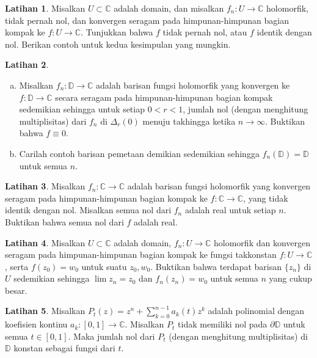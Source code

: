 \documentclass[12pt,openany]{book}
\newcommand{\C}{{\mathbb{C}}}
\newcommand{\D}{{\mathbb{D}}}
\theoremstyle{plain}
\theoremstyle{remark}
\theoremstyle{definition}
\newenvironment{exbox}{%
    \def\FrameCommand{\vrule width 1pt \relax\hspace{10pt}}%
    \MakeFramed{\advance\hsize-\width\FrameRestore}%
}{%
    \endMakeFramed
}
\newenvironment{exparts}{%
    \leavevmode\begin{enumerate}[a),noitemsep,topsep=0pt,parsep=0pt,partopsep=0pt]
}{%
    \end{enumerate}
}
\theoremstyle{exercise}
\newtheorem{exercise}{Latihan}[section]
\theoremstyle{example}
\begin{document}
\begin{exbox}
\begin{exercise}
Misalkan $U \subset \C$ adalah domain,
dan misalkan
$f_n \colon U \to \C$ holomorfik, tidak pernah nol,
dan konvergen seragam pada himpunan-himpunan bagian kompak ke $f \colon U \to \C$.
Tunjukkan bahwa $f$ tidak pernah nol, atau $f$ identik dengan nol.
Berikan contoh untuk kedua kesimpulan yang mungkin.
\end{exercise}

\begin{exercise}
\begin{exparts}
\item
Misalkan $f_n \colon \D \to \C$ adalah barisan fungsi holomorfik yang konvergen
ke $f \colon \D \to \C$ secara seragam pada himpunan-himpunan bagian kompak sedemikian sehingga
untuk setiap $0 < r < 1$, jumlah nol (dengan menghitung multiplisitas)
dari $f_n$ di $\Delta_r(0)$ menuju takhingga ketika $n \to \infty$.
Buktikan bahwa $f \equiv 0$.
\item
Carilah contoh barisan pemetaan demikian sedemikian sehingga $f_n(\D) = \D$
untuk semua $n$.
\end{exparts}
\end{exercise}

\begin{exercise}
Misalkan 
$f_n \colon \C \to \C$ adalah barisan fungsi holomorfik
yang
konvergen seragam pada himpunan-himpunan bagian kompak ke $f \colon \C \to \C$,
yang tidak identik dengan nol.
Misalkan semua nol dari $f_n$ adalah real untuk setiap $n$.
Buktikan bahwa semua nol dari $f$ adalah real.
\end{exercise}

\begin{exercise}
Misalkan $U \subset \C$ adalah domain,
$f_n \colon U \to \C$ holomorfik
dan konvergen seragam pada himpunan-himpunan bagian kompak ke fungsi takkonstan $f \colon U \to \C$,
serta $f(z_0) = w_0$ untuk suatu $z_0, w_0$.  
Buktikan bahwa terdapat barisan $\{ z_n \}$ di $U$ sedemikian sehingga
$\lim z_n = z_0$ dan $f_n(z_n) = w_0$ untuk semua $n$ yang cukup besar.
\end{exercise}

\begin{exercise}
Misalkan $P_t(z) = z^n + \sum_{k=0}^{n-1} a_k(t) z^k$ adalah polinomial
dengan koefisien kontinu $a_k \colon [0,1] \to \C$.  Misalkan $P_t$ tidak memiliki
nol pada $\partial \D$ untuk semua $t \in [0,1]$.  Maka jumlah nol
dari $P_t$ (dengan menghitung multiplisitas) di $\D$ konstan sebagai fungsi dari $t$.
\end{exercise}


\end{exbox}
\end{document}
